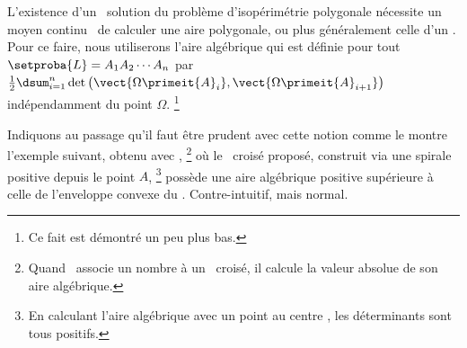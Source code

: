 L'existence d'un \ngone\ solution du problème d'isopérimétrie polygonale nécessite un moyen \og continu \fg\ de calculer une aire polygonale, ou plus généralement celle d'un \ncycle.
Pour ce faire, nous utiliserons l'aire algébrique qui est définie pour tout \ncycle\ $\setproba{L} = A_1 A_2 \cdots A_n$ par $\frac12 \dsum_{i=1}^{n} \det \big( \vect{\Omega \primeit{A}_i} , \vect{\Omega \primeit{A}_{i+1}} \big)$ indépendamment du point $\Omega$.%
\footnote{
    Ce fait est démontré un peu plus bas.
}

Indiquons au passage qu'il faut être prudent avec cette notion comme le montre l'exemple suivant, obtenu avec \geogebra,%
\footnote{
	Quand \geogebra\ associe un nombre à un \ngone\ croisé, il calcule la valeur absolue de son aire algébrique.
}
où le \ngone\ croisé proposé, construit via une spirale positive depuis le point $A$,%
\footnote{
	En calculant l'aire algébrique avec un point \og au centre \fg, les déterminants sont tous positifs.
} 
possède une aire algébrique positive supérieure à celle de l'enveloppe convexe du \ngone. Contre-intuitif, mais normal.


